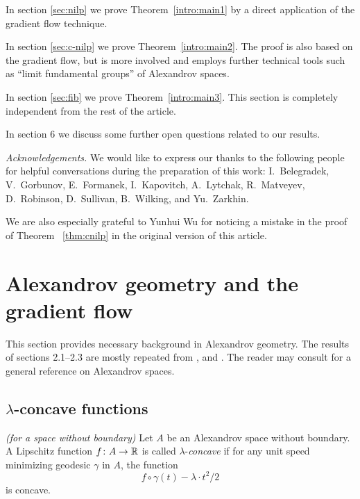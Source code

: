 \documentclass{amsart}
\begin{document}
In section \ref{sec:nilp} we prove Theorem~\ref{intro:main1} by a direct application of the gradient flow technique.

In section \ref{sec:c-nilp} we  prove Theorem~\ref{intro:main2}.
The proof is also based on the gradient flow, but
is more involved and employs further technical tools such as
``limit fundamental groups'' of Alexandrov spaces.

In section \ref{sec:fib} we prove Theorem~\ref{intro:main3}.
This section is completely independent from the rest of the article.

In section 6 we discuss some further open questions related to our results.

\smallskip

{\it Acknowledgements.}
We would like to express our thanks to the following people
for helpful conversations during the preparation of this work:
I.~Belegradek,
V.~Gorbunov, E.~Formanek, I.~Kapovitch, A.~Lytchak, R.~Matveyev, D.~Robinson,
D.~Sullivan,  B.~Wilking, and Yu.~Zarkhin.

We are also especially grateful to Yunhui Wu for noticing a mistake
in the  proof of Theorem ~\ref{thm:cnilp} in the original version of
this article.

\section{ Alexandrov geometry and the gradient flow}\label{s:gradpush}

This section
provides necessary background in Alexandrov geometry.
The results of sections 2.1--2.3 are mostly  repeated from  \cite{PP}, \cite{Ptr2} and \cite{Ptr2007}.
The reader may consult \cite{BGP} for a general reference on Alexandrov spaces.


\subsection{$\lambda$-concave functions}


\begin{defn}{\it (for a space without boundary)} Let $A$ be an Alexandrov space without boundary.
A Lipschitz function $f\colon A \rightarrow {\Bbb R}$ is called
$\lambda$-{\it concave} if for any unit speed minimizing geodesic $\gamma$
in $A$, the function
$$f\circ\gamma(t)-\lambda\cdot  t^2/2$$
is concave.
\end{defn}
\end{document}
